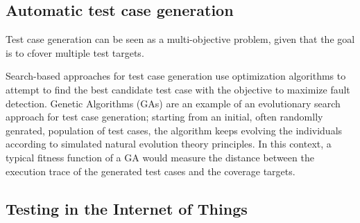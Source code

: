\subsection*{Automatic test case generation}
Test case generation can be seen as a multi-objective problem, given that the goal is to cfover multiple test targets.

Search-based approaches for test case generation use optimization algorithms to attempt to find 
the best candidate test case with the objective to maximize fault detection. Genetic Algorithms (GAs) are an example of an
evolutionary search approach for test case generation; starting from an initial, often randomlly genrated, population of 
test cases, the algorithm keeps evolving the individuals according to simulated natural evolution theory principles.
In this context, a typical fitness function of a GA would measure the distance between the execution trace of the generated test cases
and the coverage targets.


\subsection*{Testing in the Internet of Things}